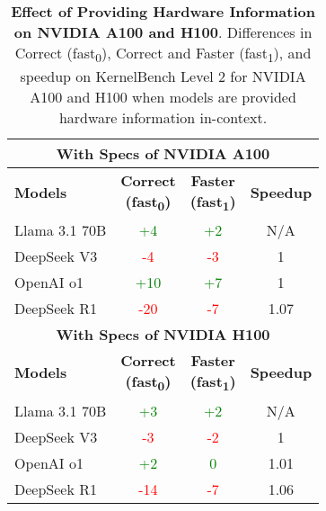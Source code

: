\begin{table}[h]
\centering
\begin{tabular}{|l|c|c|c|}
\hline
\multicolumn{4}{|c|}{\rule{0pt}{12pt}\textbf{With Specs of NVIDIA A100}} \\ \hline
\textbf{Models} & \makecell{\textbf{Correct}\\\textbf{(fast\textsubscript{0})}} & \makecell{\textbf{Faster}\\\textbf{(fast\textsubscript{1})}} & \textbf{Speedup} \\ \hline
Llama 3.1 70B       & \textcolor{green}{+4}       & \textcolor{green}{+2}       & N/A               \\ 
DeepSeek V3         & \textcolor{red}{-4}         & \textcolor{red}{-3}         & 1                \\ 
OpenAI o1           & \textcolor{green}{+10}      & \textcolor{green}{+7}       & 1                \\ 
DeepSeek R1         & \textcolor{red}{-20}        & \textcolor{red}{-7}         & 1.07             \\ \hline
\multicolumn{4}{|c|}{\rule{0pt}{12pt}\textbf{With Specs of NVIDIA H100}} \\ \hline
\textbf{Models} & \makecell{\textbf{Correct}\\\textbf{(fast\textsubscript{0})}} & \makecell{\textbf{Faster}\\\textbf{(fast\textsubscript{1})}} & \textbf{Speedup} \\ \hline
Llama 3.1 70B       & \textcolor{green}{+3}       & \textcolor{green}{+2}       & N/A               \\ 
DeepSeek V3         & \textcolor{red}{-3}         & \textcolor{red}{-2}         & 1                \\ 
OpenAI o1           & \textcolor{green}{+2}       & \textcolor{green}{0}        & 1.01             \\ 
DeepSeek R1         & \textcolor{red}{-14}        & \textcolor{red}{-7}        & 1.06             \\ \hline
\end{tabular}
\caption{\textbf{Effect of Providing Hardware Information on NVIDIA A100 and H100}. Differences in Correct (fast\textsubscript{0}), Correct and Faster (fast\textsubscript{1}), and speedup on KernelBench Level 2 for NVIDIA A100 and H100 when models are provided hardware information in-context.}
\label{tab:hw-prompt}
\end{table}




